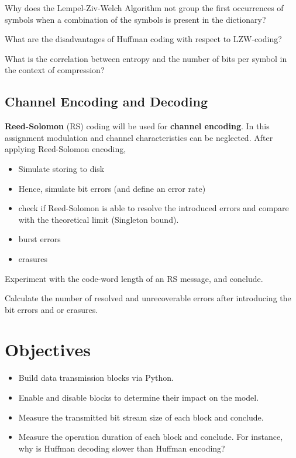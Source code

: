 \documentclass[12pt,a4paper]{article}
\begin{document}
\begin{question}
	Why does the Lempel-Ziv-Welch Algorithm not group the first occurrences of symbols when a combination of the symbols is present in the dictionary?
\end{question}

\begin{question}
	What are the disadvantages of Huffman coding with respect to LZW-coding?
\end{question}

\begin{question}
	What is the correlation between entropy and the number of bits per symbol in the context of compression? 
\end{question}



\subsection{Channel Encoding and Decoding}
\textbf{Reed-Solomon} (RS) coding will be used for \textbf{channel encoding}. 
In this assignment modulation and channel characteristics can be neglected.
After applying Reed-Solomon encoding, 
\begin{itemize}
	\item Simulate storing to disk
	\item Hence, simulate bit errors (and define an error rate)
	\item check if Reed-Solomon is able to resolve the introduced errors and compare with the theoretical limit (Singleton bound).
	\item burst errors
	\item erasures
\end{itemize}

\begin{question}
	Experiment with the code-word length of an RS message, and conclude.%
\end{question}

\begin{question}
	Calculate the number of resolved and unrecoverable errors after introducing the bit errors and or erasures.
\end{question}
 

\section{Objectives}
\begin{itemize}
	\item Build data transmission blocks via Python.%
	\item Enable and disable blocks to determine their impact on the model.%
	\item Measure the transmitted bit stream size of each block and conclude.
	\item Measure the operation duration of each block and conclude.
	For instance, why is Huffman decoding slower than Huffman encoding?
\end{itemize}
\end{document}
